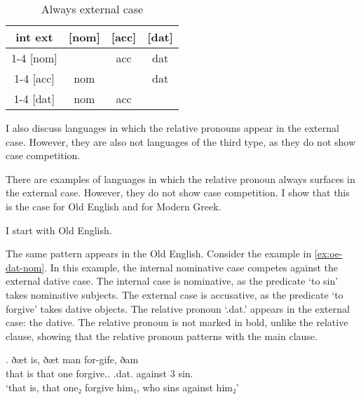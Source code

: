 \begin{table}[ht]
  \center
  \caption{Always external case}
  \begin{tabular}{c|c|c|c}
    \toprule
   \ac{int} \ac{ext}
          & [\ac{nom}]
          & [\ac{acc}]
          & [\ac{dat}]
          \\ \cmidrule{1-4}
      [\ac{nom}]
          &
          & \ac{acc}
          & \ac{dat}
          \\ \cmidrule{1-4}
      [\ac{acc}]
          & \ac{nom}
          &
          & \ac{dat}
          \\ \cmidrule{1-4}
      [\ac{dat}]
          & \ac{nom}
          & \ac{acc}
          &
          \\
    \bottomrule
  \end{tabular}
  \label{tbl:no-case-competition-ext}
\end{table}


I also discuss languages in which the relative pronouns appear in the external case. However, they are also not languages of the third type, as they do not show case competition.

There are examples of languages in which the relative pronoun always surfaces in the external case. However, they do not show case competition.
I show that this is the case for Old English and for Modern Greek.

I start with Old English.

The same pattern appears in the Old English.
Consider the example in \ref{ex:oe-dat-nom}. In this example, the internal nominative case competes against the external dative case.
The internal case is nominative, as the predicate  `to sin' takes nominative subjects.
The external case is accusative, as the predicate  `to forgive' takes dative objects.
The relative pronoun  `.\ac{dat}.' appears in the external case: the dative. The relative pronoun is not marked in bold, unlike the relative clause, showing that the relative pronoun patterns with the main clause.

\exg. ðæt is, ðæt man for-gife, ðam    \\
 that is that one forgive.. .\ac{dat}.  against 3 sin.\\
 `that is, that one₂ forgive him₁, who sins against him₂'  \label{ex:oe-dat-nom}

